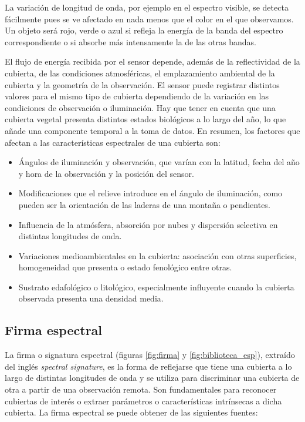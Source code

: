 La variación de longitud de onda, por ejemplo en el espectro visible, se detecta fácilmente pues se ve afectado en nada menos que el color en el que observamos. Un objeto será rojo, verde o azul si refleja la energía de la banda del espectro correspondiente o si absorbe más intensamente la de las otras bandas.\Sep

El flujo de energía recibida por el sensor depende, además de la reflectividad de la cubierta, de las condiciones atmosféricas, el emplazamiento ambiental de la cubierta y la geometría de la observación. El sensor puede registrar distintos valores para el mismo tipo de cubierta dependiendo de la variación en las condiciones de observación o iluminación. Hay que tener en cuenta que una cubierta vegetal presenta distintos estados biológicos a lo largo del año, lo que añade una componente temporal a la toma de datos. En resumen, los factores que afectan a las características espectrales de una cubierta son:
\begin{itemize}
	\item Ángulos de iluminación y observación, que varían con la latitud, fecha del año y hora de la observación y la posición del sensor.
	\item Modificaciones que el relieve introduce en el ángulo de iluminación, como pueden ser la orientación de las laderas de una montaña o pendientes.
	\item Influencia de la atmósfera, absorción por nubes y dispersión selectiva en distintas longitudes de onda.
	\item Variaciones medioambientales en la cubierta: asociación con otras superficies, homogeneidad que presenta o estado fenológico entre otras.
	\item Sustrato edafológico o litológico, especialmente influyente cuando la cubierta observada presenta una densidad media.
\end{itemize}

\subsection{Firma espectral}
La firma o signatura espectral (figuras \ref{fig:firma} y \ref{fig:biblioteca_esp}), extraído del inglés \textit{spectral signature}, es la forma de reflejarse que tiene una cubierta a lo largo de distintas longitudes de onda y se utiliza para discriminar una cubierta de otra a partir de una observación remota. Son fundamentales para reconocer cubiertas de interés o extraer parámetros o características intrínsecas a dicha cubierta. La firma espectral se puede obtener de las siguientes fuentes:


